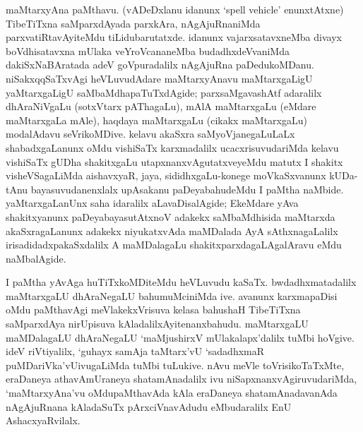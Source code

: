 maMtarxyAna paMthavu. (vADeDxlanu idanunx {\rm`spell vehicle'} enunxtAtxne) Tibe\-TiTxna saMparxdAyada parxkAra, nAgAjuRnaniMda parxvatiRtavAyiteMdu tiLidubarutatxde. idanunx vajarxsatavxneMba divayx boVdhisatavxna mUlaka veYroVcananeMba budadhxdeVvaniMda dakiSxNaBAratada adeV goVpuradalilx nAgAjuRna paDedukoMDanu. niSakxqqSaTxvAgi heVLuvudAdare maMtarxyAnavu maMtarxgaLigU yaMtarxgaLigU saMbaMdhapaTuTxdAgide; parxsaMgavashAtf adaralilx dhAraNiVgaLu (sotxVtarx pAThagaLu), mAlA maMtarxgaLu (eMdare maMtarxgaLa mAle), haqdaya maMtarxgaLu (cikakx maMtarxgaLu) modalAdavu seVrikoMDive. kelavu akaSxra saMyoVjanegaLuLaLx shabadxgaLanunx oMdu vishiSaTx karxmadalilx ucacxrisuvudariMda kelavu vishiSaTx gUDha shakitxgaLu utapxnanxvAgutatxveyeMdu matutx I shakitx visheVSagaLiMda aishavxyaR, jaya, sididhxgaLu-konege moVkaSxvanunx kUDa-tAnu bayasuvudanenxlalx upAsakanu paDeyabahudeMdu I paMtha naMbide. yaMtarxgaLanUnx saha idaralilx aLavaDisalAgide; EkeMdare yAva shakitxyanunx paDeyabayasutAtxnoV adakekx saMbaMdhisida maMtarxda akaSxragaLanunx adakekx niyukatxvAda maMDalada AyA sAthxnagaLalilx irisadidadxpakaSxdalilx A maMDalagaLu shakitxparxdagaLAgalAravu eMdu naMbalAgide.

I paMtha yAvAga huTiTxkoMDiteMdu heVLuvudu kaSaTx. bwdadhxmatadalilx maMtarx\-gaLU dhAraNegaLU bahumuMciniMda ive. avanunx karxmapaDisi oMdu paMthavAgi meVlakekxVrisuva kelasa bahushaH TibeTiTxna saMparxdAya nirUpisuva kAladalilx\break Ayitenanxbahudu. maMtarxgaLU maMDalagaLU dhAraNegaLU `maMjushirxV mUlakalapx'dalilx tuMbi hoVgive. ideV riVtiyalilx, `guhayx samAja taMtarx'vU `sadadhxmaR puMDariVka'vU\break ivugaLiMda tuMbi tuLukive. nAvu meVle toVrisikoTaTxMte, eraDaneya athavA\break mUraneya shatamAnadalilx ivu niSapxnanxvAgiruvudariMda, `maMtarxyAna'vu oMdu\break paMthavAda kAla eraDaneya shatamAnadavanAda nAgAjuRnana kAladaSuTx pArxciVna\-vAdudu eMbudaralilx EnU AshacxyaRvilalx.

\theendnotes

